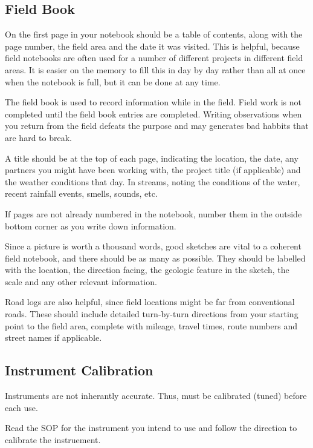 \documentclass[12pt]{../SOP3_beta}
\begin{document}
\subsection*{Field Book}

\NP On the first page in your notebook should be a table of contents, along with the page number, the field area and the date it was visited. This is helpful, because field notebooks are often used for a number of different projects in different field areas. It is easier on the memory to fill this in day by day rather than all at once when the notebook is full, but it can be done at any time.

\NP The field book is used to record information while in the field. Field work is not completed until the field book entries are completed. Writing observations when you return from the field defeats the purpose and may generates bad habbits that are hard to break.

\NP A title should be at the top of each page, indicating the location, the date, any partners you might have been working with, the project title (if applicable) and the weather conditions that day. In streams, noting the conditions of the water, recent rainfall events, smells, sounds, etc.

\NP If pages are not already numbered in the notebook, number them in the outside bottom corner as you write down information.

\NP Since a picture is worth a thousand words, good sketches are vital to a coherent field notebook, and there should be as many as possible. They should be labelled with the location, the direction facing, the geologic feature in the sketch, the scale and any other relevant information.

\NP Road logs are also helpful, since field locations might be far from conventional roads. These should include detailed turn-by-turn directions from your starting point to the field area, complete with mileage, travel times, route numbers and street names if applicable. 

\subsection{Instrument Calibration}

\NP Instruments are not inherantly accurate. Thus, must be calibrated (tuned) before each use. 

\NP Read the SOP for the instrument you intend to use and follow the direction to calibrate the instruement.
\end{document}
